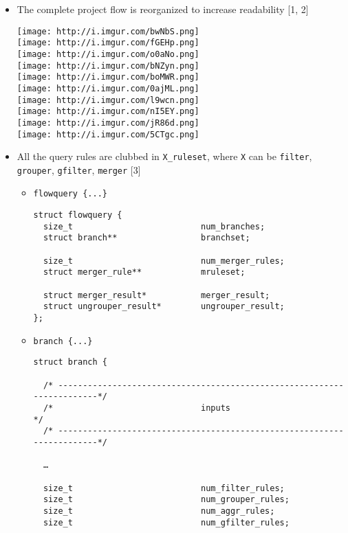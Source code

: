 \begin{itemize}
\item
  The complete project flow is reorganized to increase readability {[}1,
  2{]}

  \texttt{[image: http://i.imgur.com/bwNbS.png]}\\\texttt{[image: http://i.imgur.com/fGEHp.png]}\\\texttt{[image: http://i.imgur.com/o0aNo.png]}\\\texttt{[image: http://i.imgur.com/bNZyn.png]}\\\texttt{[image: http://i.imgur.com/boMWR.png]}\\\texttt{[image: http://i.imgur.com/0ajML.png]}\\\texttt{[image: http://i.imgur.com/l9wcn.png]}\\\texttt{[image: http://i.imgur.com/nI5EY.png]}\\\texttt{[image: http://i.imgur.com/jR86d.png]}\\\texttt{[image: http://i.imgur.com/5CTgc.png]}
\item
  All the query rules are clubbed in \lstinline!X_ruleset!, where
  \lstinline!X! can be \lstinline!filter!, \lstinline!grouper!,
  \lstinline!gfilter!, \lstinline!merger! {[}3{]}

  \begin{itemize}
  \item
    \lstinline!flowquery {...}!

\begin{lstlisting}
struct flowquery {  
  size_t                          num_branches;  
  struct branch**                 branchset;  

  size_t                          num_merger_rules;  
  struct merger_rule**            mruleset;

  struct merger_result*           merger_result; 
  struct ungrouper_result*        ungrouper_result;
};  
\end{lstlisting}
  \item
    \lstinline!branch {...}!

\begin{lstlisting}
struct branch {

  /* -----------------------------------------------------------------------*/  
  /*                              inputs                                    */
  /* -----------------------------------------------------------------------*/  

  …     

  size_t                          num_filter_rules;
  size_t                          num_grouper_rules;
  size_t                          num_aggr_rules;
  size_t                          num_gfilter_rules;


\end{lstlisting}
\end{itemize}
\end{itemize}
